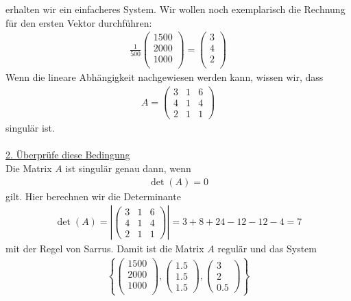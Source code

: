 erhalten wir ein einfacheres System.
Wir wollen noch exemplarisch die Rechnung für den ersten Vektor durchführen:
\begin{align*}
\frac{1}{500}
\begin{pmatrix}
1500\\
2000\\
1000\\
\end{pmatrix}
=
\begin{pmatrix}
3\\
4\\
2\\
\end{pmatrix}
\end{align*}
Wenn die lineare Abhängigkeit nachgewiesen werden kann, wissen wir, dass
\begin{align*}
A
= 
\begin{pmatrix}
3 & 1 & 6 \\
4 & 1 & 4 \\
2 & 1 & 1
\end{pmatrix}
\end{align*}
singulär ist.\\
\\
\underline{2. Überprüfe diese Bedingung}\\
Die Matrix $A$ ist singulär genau dann, wenn
\begin{align*}
\det(A) = 0
\end{align*}
gilt.
Hier berechnen wir die Determinante
\begin{equation*}
\begin{split}
\det(A)
=
\left|
\begin{pmatrix}
3 & 1 & 6 \\
4 & 1 & 4 \\
2 & 1 & 1
\end{pmatrix}
\right|
=
3 + 8 + 24 - 12 - 12 -4
= 
7
\end{split}
\end{equation*}
mit der Regel von Sarrus.
Damit ist die Matrix $A$ regulär und das System
\begin{align*}
\left\lbrace 
\begin{pmatrix}
1500\\
2000\\
1000\\
\end{pmatrix},
\begin{pmatrix}
1.5\\
1.5\\
1.5
\end{pmatrix},
\begin{pmatrix}
3\\
2\\ 
0.5
\end{pmatrix}
\right\rbrace
\end{align*}
